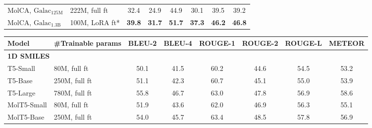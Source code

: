 \documentclass[11pt]{article}
\begin{document}
\begin{table*}[t]
\begin{subtable}[t]{\textwidth}
\begin{tabular}{llcccccc}
    MolCA, $\text{Galac}_{\text{125M}}$    & 222M, full ft                 & 32.4                 & 24.9                 & 44.9                 & 30.1                 & 39.5                 & 39.2                 \\
    MolCA, $\text{Galac}_{\text{1.3B}}$        & 100M, LoRA ft*                     & \textbf{39.8}        & \textbf{31.7}        & \textbf{51.7}        & \textbf{37.3}        & \textbf{46.2}        & \textbf{46.8}         \\\bottomrule
    \end{tabular}
    \caption{PubChem324k dataset. Baseline performances are reproduced using their source codes~\citep{MolT5, MoMu}.}
    \label{tab:pubchem32k_cap}
    \end{subtable}
    \begin{subtable}[t]{\textwidth}
    \small
    \centering
    \setlength{\tabcolsep}{4pt}
    \begin{tabular}{llcccccc}\toprule
    Model                  & \#Trainable params       & BLEU-2               & BLEU-4               & ROUGE-1              & ROUGE-2              & ROUGE-L              & METEOR               \\\midrule
    \multicolumn{2}{l}{\textbf{1D SMILES}}            & \multicolumn{1}{l}{} & \multicolumn{1}{l}{} & \multicolumn{1}{l}{} & \multicolumn{1}{l}{} & \multicolumn{1}{l}{} & \multicolumn{1}{l}{} \\
    T5-Small               & 80M, full ft                      & 50.1                 & 41.5                 & 60.2                 & 44.6                 & 54.5                 & 53.2                 \\
    T5-Base                & 250M, full ft                     & 51.1                 & 42.3                 & 60.7                 & 45.1                 & 55.0                 & 53.9                 \\
    T5-Large               & 780M, full ft                     & 55.8                 & 46.7                 & 63.0                 & 47.8                 & 56.9                 & 58.6                 \\
    MolT5-Small            & 80M, full ft                      & 51.9                 & 43.6                 & 62.0                 & 46.9                 & 56.3                 & 55.1                 \\
    MolT5-Base             & 250M, full ft                     & 54.0                 & 45.7                 & 63.4                 & 48.5                 & 57.8                 & 56.9                 \\

\end{tabular}
\end{subtable}
\end{table*}
\end{document}
